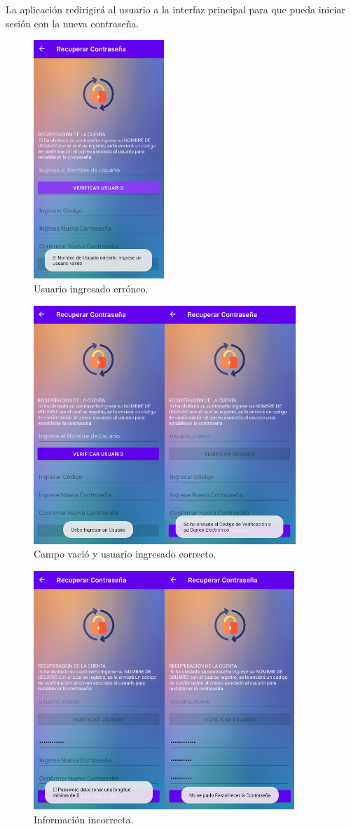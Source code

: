 \documentclass[a4paper,10pt, oneside, titlepage]{article}
\begin{document}
	La aplicación redirigirá al usuario a la interfaz principal para que pueda iniciar sesión con la nueva contraseña.
	\begin{figure}[!ht]
		\centering
		\includegraphics[width = .4\linewidth, height = 9cm]{25.png}
		\caption{Usuario ingresado erróneo.}
	\end{figure}
	\begin{figure}[!ht]
		\centering
		\includegraphics[width = .75\linewidth, height = 9cm]{26.png}
		\caption{Campo vació y usuario ingresado correcto.}
	\end{figure}
	\begin{figure}[!ht]
		\centering
		\includegraphics[width = .75\linewidth, height = 9cm]{27.png}
		\caption{Información incorrecta.}
	\end{figure}
\end{document}
